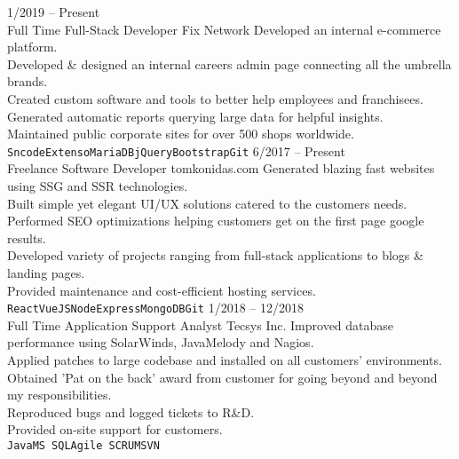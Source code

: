 \documentclass[9pt]{developercv} %
\begin{document}
\begin{entrylist}
	\entry
		{1/2019 -- Present\\\footnotesize{Full Time}}
		{Full-Stack Developer}
		{Fix Network}
		{Developed an internal e-commerce platform.\\
      Developed \& designed an internal careers admin page connecting all the umbrella brands.\\
      Created custom software and tools to better help employees and franchisees.\\
      Generated automatic reports querying large data for helpful insights.\\ 
      Maintained public corporate sites for over 500 shops worldwide.
      \\\texttt{Sncode}\slashsep\texttt{Extenso}\slashsep\texttt{MariaDB}\slashsep\texttt{jQuery}\slashsep\texttt{Bootstrap}\slashsep\texttt{Git}}
	\entry
		{6/2017 -- Present\\\footnotesize{Freelance}}
		{Software Developer}
		{tomkonidas.com}
		{Generated blazing fast websites using SSG and SSR technologies.\\
      Built simple yet elegant UI/UX solutions catered to the customers needs.\\
      Performed SEO optimizations helping customers get on the first page google results.\\
      Developed variety of projects ranging from full-stack applications to blogs \& landing pages.\\
      Provided maintenance and cost-efficient hosting services.
      \\\texttt{React}\slashsep\texttt{VueJS}\slashsep\texttt{Node}\slashsep\texttt{Express}\slashsep\texttt{MongoDB}\slashsep\texttt{Git}}
	\entry
		{1/2018 -- 12/2018\\\footnotesize{Full Time}}
		{Application Support Analyst}
		{Tecsys Inc.}
		{Improved database performance using SolarWinds, JavaMelody and Nagios.\\
      Applied patches to large codebase and installed on all customers' environments.\\
      Obtained 'Pat on the back' award from customer for going beyond and beyond my responsibilities.\\
      Reproduced bugs and logged tickets to R\&D.\\
      Provided on-site support for customers.
      \\\texttt{Java}\slashsep\texttt{MS SQL}\slashsep\texttt{Agile SCRUM}\slashsep\texttt{SVN}}

\end{entrylist}
\end{document}
